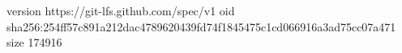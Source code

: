 version https://git-lfs.github.com/spec/v1
oid sha256:254ff57c891a212dac4789620439fd74f1845475c1cd066916a3ad75cc07a471
size 174916
